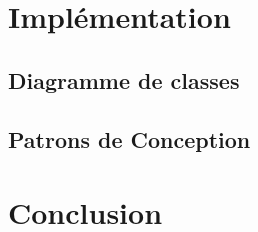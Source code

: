 \documentclass[12pt]{article}
\begin{document}
\section{Implémentation}			\label{sec:implementation}
\subsection{Diagramme de classes}	\label{sec:diagrammeClasses}		
\subsection{Patrons de Conception}	\label{sec:patronsConception}		
\newpage

\section{Conclusion} 			\label{sec:conclusion}			
\end{document}
